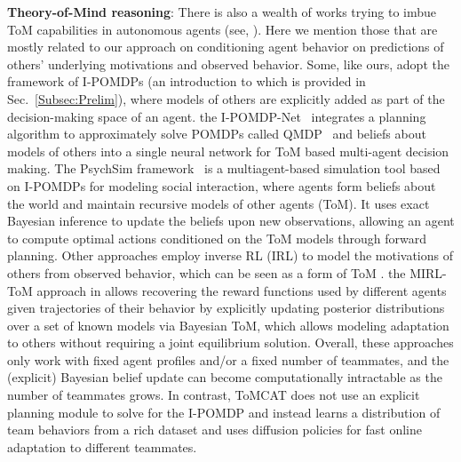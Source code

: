 \textbf{Theory-of-Mind reasoning}: There is also a wealth of works trying to imbue ToM capabilities in autonomous agents (see, \eg \citep{gurney2022tom,rocha2023tom}). Here we mention those that are mostly related to our approach on conditioning agent behavior on predictions of others' underlying motivations and observed behavior. Some, like ours, adopt the framework of I-POMDPs \citep{gmytrasiewicz2005ipomdp, han2018learning} (an introduction to which is provided in Sec.~\ref{Subsec:Prelim}), where models of others are explicitly added as part of the decision-making space of an agent. \Eg the I-POMDP-Net~\citep{han2019ipomdp} integrates a planning algorithm to approximately solve POMDPs called QMDP~\citep{Karkus2017qmdpnet} and beliefs about models of others into a single neural network for ToM based multi-agent decision making. The PsychSim framework~\citep{pynadath2005psychsim} is a multiagent-based simulation tool based on I-POMDPs for modeling social interaction, where agents form beliefs about the world and maintain recursive models of other agents (ToM). It uses exact Bayesian inference to update the beliefs upon new observations, allowing an agent to compute optimal actions conditioned on the ToM models through forward planning. 
%
Other approaches employ inverse RL (IRL) to model the motivations of others from observed behavior, which can be seen as a form of ToM \citep{jaraettinger2019tomirl}. \Eg the MIRL-ToM approach in \citep{wu2023multiagent} allows recovering the reward functions used by different agents given trajectories of their behavior by explicitly updating posterior distributions over a set of known models via Bayesian ToM, which allows modeling adaptation to others without requiring a joint equilibrium solution. Overall, these approaches only work with fixed agent profiles and/or a fixed number of teammates, and the (explicit) Bayesian belief update can become computationally intractable as the number of teammates grows. In contrast, ToMCAT does not use an explicit planning module to solve for the I-POMDP and instead learns a distribution of team behaviors from a rich dataset and uses diffusion policies for fast online adaptation to different teammates.

